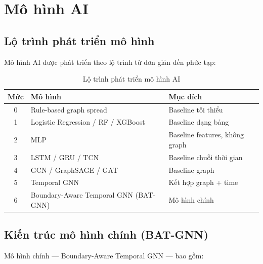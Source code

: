 \section{Mô hình AI}
\label{sec:aimodel}

\subsection{Lộ trình phát triển mô hình}

Mô hình AI được phát triển theo lộ trình từ đơn giản đến phức tạp:

\begin{table}[H]
\centering
\caption{Lộ trình phát triển mô hình AI}
\label{tab:modelroadmap}
\begin{tabularx}{\textwidth}{c l X}
\toprule
\textbf{Mức} & \textbf{Mô hình} & \textbf{Mục đích} \\
\midrule
0 & Rule-based graph spread          & Baseline tối thiểu \\
1 & Logistic Regression / RF / XGBoost & Baseline dạng bảng \\
2 & MLP                              & Baseline features, không graph \\
3 & LSTM / GRU / TCN                 & Baseline chuỗi thời gian \\
4 & GCN / GraphSAGE / GAT           & Baseline graph \\
5 & Temporal GNN                     & Kết hợp graph + time \\
6 & Boundary-Aware Temporal GNN (BAT-GNN) & Mô hình chính \\
\bottomrule
\end{tabularx}
\end{table}

\subsection{Kiến trúc mô hình chính (BAT-GNN)}

Mô hình chính — Boundary-Aware Temporal GNN — bao gồm:

